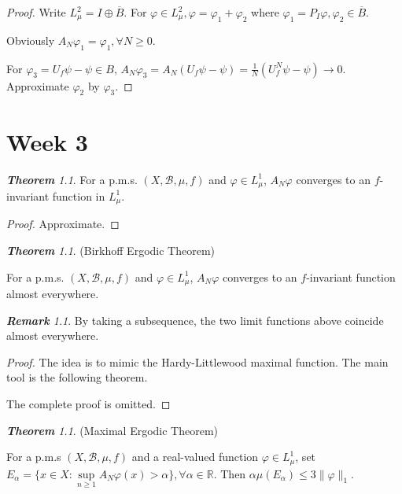 \documentclass[10pt, a4paper, oneside]{report}
\numberwithin{equation}{chapter}
\theoremstyle{remark}
\newtheorem{theorem}[definition]{\bf{Theorem}}
\theoremstyle{remark}
\newtheorem{remark}{\bf{Remark}}[chapter]
\begin{document}
\begin{proof}
    Write $L_\mu^2=I\oplus\overline{B}$. For $\varphi\in L_\mu^2,\varphi=\varphi_1+\varphi_2$ where $\varphi_1=P_I\varphi,\varphi_2\in\overline{B}$.

    Obviously $A_N\varphi_1=\varphi_1,\forall N\geqslant 0$. 
    
    For $\varphi_3=U_f\psi-\psi\in B$, $A_N\varphi_3=A_N(U_f\psi-\psi)=\frac{1}{N}(U_f^N\psi-\psi)\to 0$. Approximate $\varphi_2$ by $\varphi_3$.
\end{proof}

\chapter{Week 3}
\begin{theorem}
    For a p.m.s. $(X,\mathcal{B},\mu,f)$ and $\varphi\in L_\mu^1$, $A_N\varphi$ converges to an $f$-invariant function in $L_\mu^1$.
\end{theorem}

\begin{proof}
    Approximate.
\end{proof}

\begin{theorem}
    (Birkhoff Ergodic Theorem)

    For a p.m.s. $(X,\mathcal{B},\mu,f)$ and $\varphi\in L_\mu^1$, $A_N\varphi$ converges to an $f$-invariant function almost everywhere. 
\end{theorem}

\begin{remark}
    By taking a subsequence, the two limit functions above coincide almost everywhere.
\end{remark}

\begin{proof}
    The idea is to mimic the Hardy-Littlewood maximal function. The main tool is the following theorem.

    The complete proof is omitted.
\end{proof}

\begin{theorem}
    (Maximal Ergodic Theorem)

    For a p.m.s $(X,\mathcal{B},\mu,f)$ and a real-valued function $\varphi\in L_\mu^1$, set $E_\alpha=\{x\in X:\sup\limits_{n\geqslant 1}A_N\varphi(x)>\alpha\},\forall\alpha\in\mathbb{R}$. Then $\alpha\mu(E_\alpha)\leqslant 3\|\varphi\|_1.$ 
\end{theorem}
\end{document}
